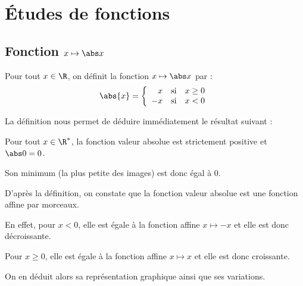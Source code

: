 \documentclass[10pt,openright,twoside,french]{book}
\begin{document}
\chapter{\'Etudes de fonctions}\label{ch_etudes_fonctions}

\section{Fonction $x \mapsto  \abs x$}

\begin{Defi}
    Pour tout $x \in \R$, on définit la fonction  $x \mapsto \abs x$ par :
    \[\abs{x} =
    \left\{\begin{array}{r@{\quad\text{si}\quad}l}
         x & x \geq 0 \\
        -x & x < 0
    \end{array}\right.\]
\end{Defi}

La définition nous permet de déduire immédiatement le résultat suivant :

\begin{Prop}
    Pour tout $x \in \R^*$, la fonction valeur absolue est strictement positive et $\abs 0 = 0$.\par
    Son minimum (la plus petite des images) est donc égal à $0$.
\end{Prop}

D'après la définition, on constate que la fonction valeur absolue est une fonction affine par morceaux.\par
En effet, pour $x < 0$, elle est égale à la fonction affine $x \mapsto -x$ et elle est donc décroissante.\par
Pour $x \geq 0$, elle est égale à la fonction affine $x \mapsto x$ et elle est donc croissante.\par
On en déduit alors sa représentation graphique ainsi que ses variations.

\begin{center}
\end{center}
\end{document}
